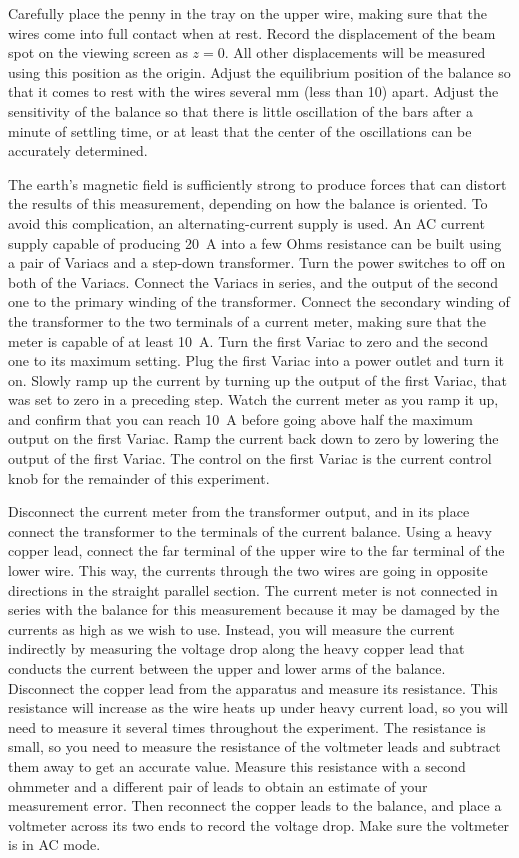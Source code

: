 \documentclass{revtex4}
\begin{document}
Carefully place the penny in the tray on the upper wire, making sure that
the wires come into full contact when at rest.
Record the displacement of the beam spot on the viewing screen as 
$z=0$.  All other displacements will be measured
using this position as the origin.  Adjust the equilibrium position of
the balance so that it comes to rest with the wires several mm 
(less than 10) apart.  Adjust the sensitivity of the balance so that
there is little oscillation of the bars after a minute of settling time,
or at least that the center of the oscillations can be accurately 
determined.

The earth's magnetic field is sufficiently strong to produce forces that
can distort the results of this measurement, depending on how the balance
is oriented.  To avoid this complication, an alternating-current supply
is used.  An AC current supply capable of producing 20~A into a few Ohms
resistance can be built using a pair of Variacs and a step-down transformer.
Turn the power switches to off on both of the Variacs.
Connect the Variacs in series, and the output of the second one to the
primary winding of the transformer.  Connect the secondary winding of
the transformer to the two terminals of a current meter, making sure that
the meter is capable of at least 10~A.  Turn the first Variac to zero and
the second one to its maximum setting.  Plug the first Variac into a power
outlet and turn it on.  Slowly ramp up the current by turning up the
output of the first Variac, that was set to zero in a preceding step.
Watch the current meter as you ramp it up, and confirm that you can reach
10~A before going above half the maximum output on the first Variac.
Ramp the current back down to zero by lowering the output of the first
Variac.  The control on the first Variac is the current control knob for
the remainder of this experiment.

Disconnect the current meter from the transformer output, and in its place
connect the transformer to the terminals of the current balance.  Using a
heavy copper lead, connect the far terminal of the upper wire to the far
terminal of the lower wire.  This way, the currents through the two wires
are going in opposite directions in the straight parallel section.  The
current meter is not connected in series with the balance for this
measurement because it may be damaged by the currents as high as we
wish to use.  Instead, you will measure the current indirectly by measuring
the voltage drop along the heavy copper lead that conducts the current between
the upper and lower arms of the balance.  Disconnect the copper lead from
the apparatus and measure its resistance.  This resistance will increase
as the wire heats up under heavy current load, so you will need to measure
it several times throughout the experiment.  The resistance is small, so
you need to measure the resistance of the voltmeter leads and subtract them
away to get an accurate value.  Measure this resistance with a second
ohmmeter and a different pair of leads to obtain an estimate of your
measurement error.  Then reconnect the copper leads to the balance, and
place a voltmeter across its two ends to record the voltage drop.  Make
sure the voltmeter is in AC mode.
\end{document}
